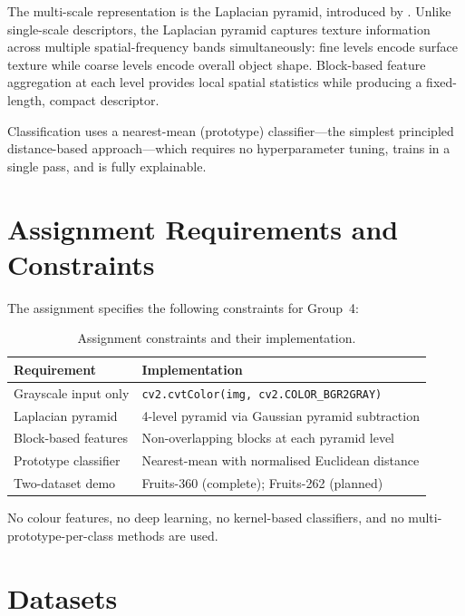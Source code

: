 \documentclass[11pt,a4paper]{article}
\begin{document}
The multi-scale representation is the Laplacian pyramid, introduced by
\citet{burt1983laplacian}.  Unlike single-scale descriptors, the Laplacian
pyramid captures texture information across multiple spatial-frequency bands
simultaneously: fine levels encode surface texture while coarse levels encode
overall object shape.  Block-based feature aggregation at each level provides
local spatial statistics while producing a fixed-length, compact descriptor.

Classification uses a nearest-mean (prototype) classifier---the simplest
principled distance-based approach---which requires no hyperparameter tuning,
trains in a single pass, and is fully explainable.

\section{Assignment Requirements and Constraints}

The assignment specifies the following constraints for Group~4:

\begin{table}[H]
  \centering
  \caption{Assignment constraints and their implementation.}
  \label{tab:constraints}
  \begin{tabular}{@{}ll@{}}
    \toprule
    \textbf{Requirement} & \textbf{Implementation} \\
    \midrule
    Grayscale input only & \texttt{cv2.cvtColor(img, cv2.COLOR\_BGR2GRAY)} \\
    Laplacian pyramid & 4-level pyramid via Gaussian pyramid subtraction \\
    Block-based features & Non-overlapping blocks at each pyramid level \\
    Prototype classifier & Nearest-mean with normalised Euclidean distance \\
    Two-dataset demo & Fruits-360 (complete); Fruits-262 (planned) \\
    \bottomrule
  \end{tabular}
\end{table}

No colour features, no deep learning, no kernel-based classifiers, and no
multi-prototype-per-class methods are used.

\section{Datasets}
\end{document}
